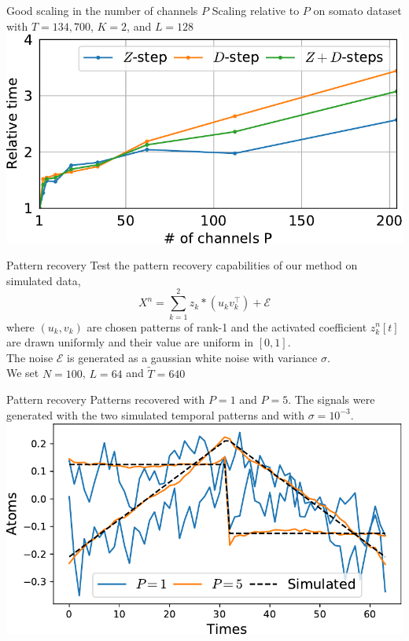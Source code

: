 \documentclass{beamer}
\def\tT{\widetilde{T}}
\begin{document}


\begin{frame}{Good scaling in the number of channels $P$}
    Scaling relative to $P$ on somato dataset with $T=134,700$, $K=2$, and $L=128$\\[1em]
    \includegraphics[width=\textwidth]{scaling_channels_reg0_001_mean_rank1_K2_L128.pdf}
\end{frame}

\begin{frame}{Pattern recovery}
Test the pattern recovery capabilities of our method on simulated data,
\[
	X^n = \sum_{k=1}^2 z_k * (u_kv_k^\top) + \mathcal E
\]
where $(u_k, v_k)$ are chosen patterns of rank-1 and the activated coefficient $z^n_k[t]$ are drawn uniformly and their value are uniform in $[0, 1]$.\\[1em]
The noise $\mathcal E$ is generated as a gaussian white noise with variance $\sigma$.\\[1em]

We set $N=100$, $L=64$ and $\tT=640$
\end{frame}

\begin{frame}{Pattern recovery}
Patterns recovered with $P = 1$ and $P=5$. The signals were generated with the two simulated temporal patterns and with  $\sigma = 10^{-3}$. \\[1em]
\includegraphics[width=\textwidth]{1D_vs_multi_uv_hat_P5.pdf}
\end{frame}
\end{document}
